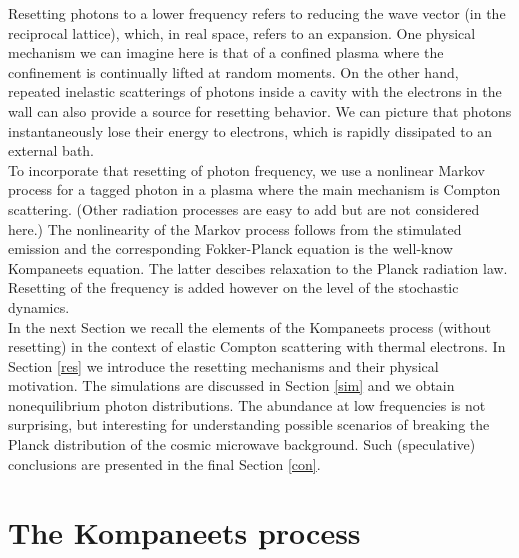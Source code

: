 \documentclass[a4paper,12pt,reqno,superscriptaddress,nofootinbib]{article}
\theoremstyle{plain}
\theoremstyle{definition}
\theoremstyle{remark}
\newcommand{\0}{^{(0)}}
\newcommand{\1}{^{(1)}}
\newcommand{\2}{^{(2)}}
\begin{document}
Resetting photons to a lower frequency refers to reducing the wave vector (in the reciprocal lattice), which, in real space, refers to an expansion. One physical mechanism we can imagine here is that of a confined plasma where the confinement is continually lifted at random moments. On the other hand, repeated inelastic scatterings of photons inside a cavity with the electrons in the wall can also provide a source for resetting behavior. We can picture that photons instantaneously lose their energy to electrons, which is rapidly dissipated to an external bath. \\
To incorporate that resetting of photon frequency, we use a nonlinear Markov process for a tagged photon in a plasma where the main mechanism is Compton scattering.  (Other radiation processes are easy to add but are not considered here.)  The nonlinearity of the Markov process follows from the stimulated emission and the corresponding Fokker-Planck equation is the well-know Kompaneets equation.  The latter descibes relaxation to the Planck radiation law.  Resetting of the frequency is added however on the level of the stochastic dynamics.\\

In the next Section we recall the elements of the Kompaneets process (without resetting) in the context of elastic Compton scattering with thermal electrons.  In Section \ref{res} we introduce the resetting mechanisms and their physical motivation.  The simulations are discussed in Section \ref{sim} and we obtain nonequilibrium photon distributions.  The abundance at low frequencies is not surprising, but interesting for understanding possible scenarios of breaking the Planck distribution of the cosmic microwave background.  Such (speculative) conclusions are presented in the final Section \ref{con}. 

\section{The Kompaneets process}
\end{document}
